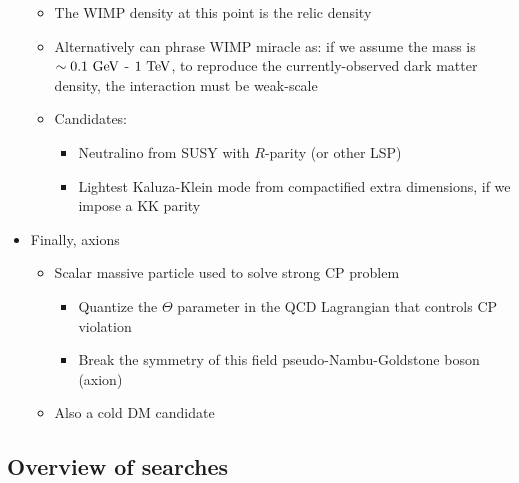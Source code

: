 \begin{itemize}
\begin{itemize}
    \item The WIMP density at this point is the relic density
    \item Alternatively can phrase WIMP miracle as: if we assume the mass is $\sim 0.1~\text{GeV}$ - $1~\text{TeV}$, to reproduce the currently-observed dark matter density, the interaction must be weak-scale
    \item Candidates:
    \begin{itemize}
      \item Neutralino from SUSY with $R$-parity (or other LSP)
      \item Lightest Kaluza-Klein mode from compactified extra dimensions, if we impose a KK parity
    \end{itemize}
  \end{itemize}
  \item Finally, axions
  \begin{itemize}
    \item Scalar massive particle used to solve strong CP problem 
    \begin{itemize}
      \item Quantize the $\Theta$ parameter in the QCD Lagrangian that controls CP violation
      \item Break the symmetry of this field \thus pseudo-Nambu-Goldstone boson (axion)
    \end{itemize}
    \item Also a cold DM candidate
  \end{itemize}
\end{itemize}

\subsection{Overview of searches}

